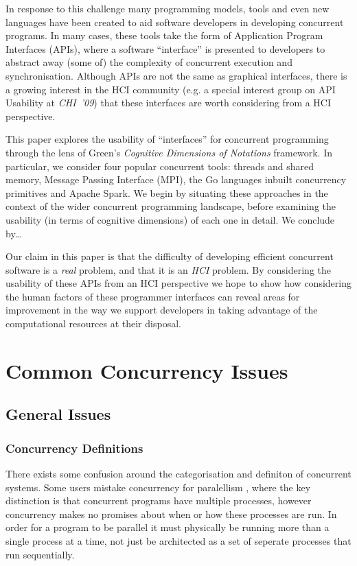 \documentclass{sig-alternate}
\begin{document}
In response to this challenge many programming models, tools and even new languages have been created to aid software developers in developing concurrent programs. In many cases, these tools take the form of Application Program Interfaces (APIs), where a software ``interface'' is presented to developers to abstract away (some of) the complexity of concurrent execution and synchronisation. Although APIs are not the same as graphical interfaces, there is a growing interest in the HCI community (e.g. a special interest group on API Usability at \emph{CHI~'09}\cite{daughtry_api_2009}) that these interfaces are worth considering from a HCI perspective.

This paper explores the usability of ``interfaces'' for concurrent programming through the lens of Green's \emph{Cognitive Dimensions of  Notations} framework\cite{green89:_cognit_dimen_notat}. In particular, we consider four popular concurrent tools: threads and shared memory, Message Passing Interface (MPI), the Go languages inbuilt concurrency primitives and Apache Spark.  We begin by situating these approaches in the context of the wider concurrent programming landscape, before examining the usability (in terms of cognitive dimensions) of each one in detail. We conclude by\ldots

Our claim in this paper is that the difficulty of developing efficient concurrent software is a \emph{real} problem, and that it is an \emph{HCI} problem. By considering the usability of these APIs from an HCI perspective we hope to show how considering the human factors of these programmer interfaces can reveal areas for improvement in the way we support developers in taking advantage of the computational resources at their disposal.

\section{Common Concurrency Issues}
\subsection{General Issues}
\subsubsection{Concurrency Definitions}

There exists some confusion around the categorisation and definiton of concurrent systems. Some users mistake concurrency for paralellism \cite{pike13:_concur_paral}, where the key distinction is that concurrent programs have multiple processes, however concurrency makes no promises about when or how these processes are run. In order for a program to be parallel it must physically be running more than a single process at a time, not just be architected as a set of seperate processes that run sequentially.
\end{document}

